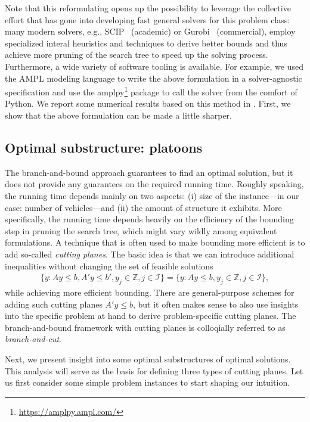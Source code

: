 \documentclass[a4paper]{report}
\theoremstyle{definition}
\theoremstyle{plain}
\begin{document}
Note that this reformulating opens up the possibility to leverage the collective
effort that has gone into developing fast general solvers for this problem
class: many modern solvers, e.g., SCIP~\cite{BolusaniEtal2024OO} (academic) or
Gurobi~\cite{gurobi} (commercial), employ specialized interal heuristics and
techniques to derive better bounds and thus achieve more pruning of the search
tree to speed up the solving process.
%
Furthermore, a wide variety of software tooling is available. For example, we
used the AMPL modeling language to write the above formulation in a
solver-agnostic specification and use the
amplpy\footnote{\url{https://amplpy.ampl.com/}} package to call the solver from
the comfort of Python.
%
We report some numerical results based on this method in
. First, we show that the above formulation can be made
a little sharper.


\subsection{Optimal substructure: platoons}\label{sec:platoons}

The branch-and-bound approach guarantees to find an optimal solution, but it
does not provide any guarantees on the required running time.
%
Roughly speaking, the running time depends mainly on two aspects: (i) size of
the instance---in our case: number of vehicles---and (ii) the amount of structure it
exhibits.
%
More specifically, the running time depends heavily on the efficiency of the
bounding step in pruning the search tree, which might vary wildly among
equivalent formulations.
%
A technique that is often used to make bounding more efficient is to add
so-called \emph{cutting planes}.
%
The basic idea is that we can introduce additional inequalities
without changing the set of feasible solutions
\begin{align}
  \{ y : Ay \leq b, A'y \leq b', y_j \in \mathbb{Z}, j \in \mathcal{I} \} = \{ y : Ay \leq b, y_j \in \mathbb{Z}, j \in \mathcal{I} \} ,
\end{align}
while achieving more efficient bounding.
%
There are general-purpose schemes for adding such cutting planes $A' y \leq b$,
but it often makes sense to also use insights into the specific problem at hand
to derive problem-specific cutting planes.
%
The branch-and-bound framework with cutting planes is colloqially referred to as
\emph{branch-and-cut}.

Next, we present insight into some optimal substructures of optimal solutions.
This analysis will serve as the basis for defining three types of cutting
planes.
%
Let us first consider some simple problem instances to start shaping our
intuition.
\end{document}
